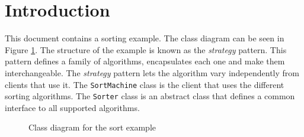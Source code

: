 \documentclass[\pformat,12pt]{article}
\begin{document}

\section{Introduction}

This document contains a sorting example. The class diagram can be
seen in Figure \ref{inh}.  The structure of the example is known as
the \textit{strategy} pattern. This pattern defines a family of
algorithms, encapsulates each one and make them interchangeable. The
\textit{strategy} pattern lets the algorithm vary independently from
clients that use it. The \texttt{SortMachine} class is the client that uses the
different sorting algorithms. The \texttt{Sorter} class is an abstract class
that defines a common interface to all supported algorithms.


\begin{figure}[tbh]
\begin{center}
\mbox{}
\caption{Class diagram for the sort example}\label{inh}
\end{center}
\end{figure}













\newpage
{}
\printindex
\end{document}
